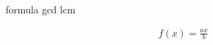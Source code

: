 \hypertarget{inroduction}{%
\label{sec:introduction}}
\thispagestyle{fancy}
\blindtext \Gls{formula} \acrlong{gcd} \acrshort{lcm}
\cite{gilchrist_2016}
\cite{sadalage_fowler_2016} 

\begin{align}
    f(x) = \frac{ax}{b}
\end{align}